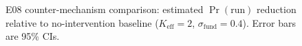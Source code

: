 \begin{figure}[h]
\centering
\caption{E08 counter-mechanism comparison: estimated $\Pr(\text{run})$ reduction relative to no-intervention baseline ($K_{\text{eff}}=2$, $\sigma_{\text{fund}}=0.4$). Error bars are 95\% CIs.}
\label{fig:e08}
\end{figure}


